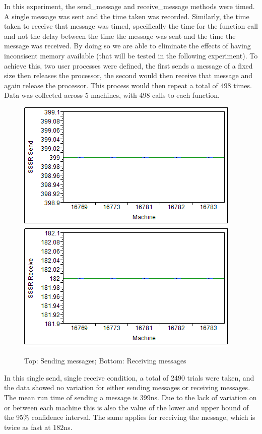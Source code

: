\documentclass[12pt]{report}
\begin{document}
In this experiment, the send\_message and receive\_message methods were timed. A single message was sent and the time taken was recorded. Similarly, the time taken to receive that message was timed, specifically the time for the function call and not the delay between the time the message was sent and the time the message was received. By doing so we are able to eliminate the effects of having inconsisent memory available (that will be tested in the following experiment). To achieve this, two user processes were defined, the first sends a message of a fixed size then releases the processor, the second would then receive that message and again release the processor. This process would then repeat a total of 498 times. Data was collected across 5 machines, with 498 calls to each function.

\begin{figure}[h!]
  \centering
    \includegraphics{SSSRSend.png}
    \includegraphics{SSSRReceive.png}
  \caption{Top: Sending messages; Bottom: Receiving messages}
\end{figure}

In this single send, single receive condition, a total of 2490 trials were taken, and the data showed no variation for either sending messages or receiving messages. The mean run time of sending a message is 399ns. Due to the lack of variation on or between each machine this is also the value of the lower and upper bound of the 95\% confidence interval. The same applies for receiving the message, which is twice as fast at 182ns.
\end{document}
